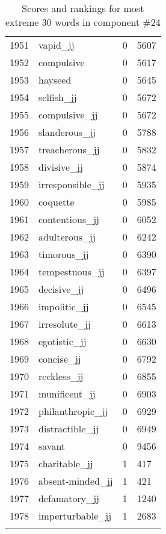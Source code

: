 \begin{longtable}[!htbp]{| rlr@{.}l |}
    1951 & vapid\_jj & 0 & 5607 \\
    1952 & compulsive & 0 & 5617 \\
    1953 & hayseed & 0 & 5645 \\
    1954 & selfish\_jj & 0 & 5672 \\
    1955 & compulsive\_jj & 0 & 5672 \\
    1956 & slanderous\_jj & 0 & 5788 \\
    1957 & treacherous\_jj & 0 & 5832 \\
    1958 & divisive\_jj & 0 & 5874 \\
    1959 & irresponsible\_jj & 0 & 5935 \\
    1960 & coquette & 0 & 5985 \\
    1961 & contentious\_jj & 0 & 6052 \\
    1962 & adulterous\_jj & 0 & 6242 \\
    1963 & timorous\_jj & 0 & 6390 \\
    1964 & tempestuous\_jj & 0 & 6397 \\
    1965 & decisive\_jj & 0 & 6496 \\
    1966 & impolitic\_jj & 0 & 6545 \\
    1967 & irresolute\_jj & 0 & 6613 \\
    1968 & egotistic\_jj & 0 & 6630 \\
    1969 & concise\_jj & 0 & 6792 \\
    1970 & reckless\_jj & 0 & 6855 \\
    1971 & munificent\_jj & 0 & 6903 \\
    1972 & philanthropic\_jj & 0 & 6929 \\
    1973 & distractible\_jj & 0 & 6949 \\
    1974 & savant & 0 & 9456 \\
    1975 & charitable\_jj & 1 & 417 \\
    1976 & absent-minded\_jj & 1 & 421 \\
    1977 & defamatory\_jj & 1 & 1240 \\
    1978 & imperturbable\_jj & 1 & 2683 \\
    \hline
    \caption{Scores and rankings for most extreme 30 words in component \#24} \\
\end{longtable}
